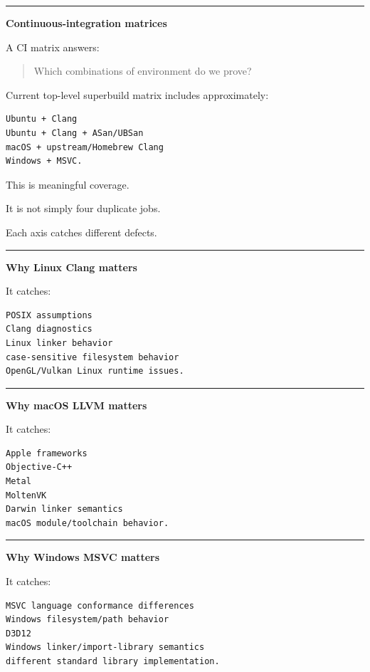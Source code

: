 \begin{center}\rule{0.5\linewidth}{0.5pt}\end{center}

\textbf{Continuous-integration matrices}

A CI matrix answers:

\begin{quote}
Which combinations of environment do we prove?
\end{quote}

Current top-level superbuild matrix includes approximately:

\begin{verbatim}
Ubuntu + Clang
Ubuntu + Clang + ASan/UBSan
macOS + upstream/Homebrew Clang
Windows + MSVC.
\end{verbatim}

This is meaningful coverage.

It is not simply four duplicate jobs.

Each axis catches different defects.

\begin{center}\rule{0.5\linewidth}{0.5pt}\end{center}

\textbf{Why Linux Clang matters}

It catches:

\begin{verbatim}
POSIX assumptions
Clang diagnostics
Linux linker behavior
case-sensitive filesystem behavior
OpenGL/Vulkan Linux runtime issues.
\end{verbatim}

\begin{center}\rule{0.5\linewidth}{0.5pt}\end{center}

\textbf{Why macOS LLVM matters}

It catches:

\begin{verbatim}
Apple frameworks
Objective-C++
Metal
MoltenVK
Darwin linker semantics
macOS module/toolchain behavior.
\end{verbatim}

\begin{center}\rule{0.5\linewidth}{0.5pt}\end{center}

\textbf{Why Windows MSVC matters}

It catches:

\begin{verbatim}
MSVC language conformance differences
Windows filesystem/path behavior
D3D12
Windows linker/import-library semantics
different standard library implementation.
\end{verbatim}

